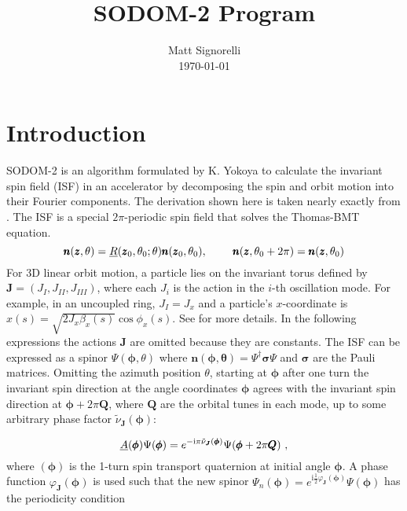 \documentclass{hitec}     %
\title{SODOM-2 Program}
\author{}
\date{Matt Signorelli\\ \today}
\newcommand{\Section}[1]{\section{#1}\vspace*{-1ex}}
\begin{document}
{}
\maketitle
{}
{}
\tableofcontents


\Section{Introduction}
\label{s:intro}
SODOM-2 is an algorithm formulated by K. Yokoya \cite{b:yokoya} to calculate the invariant spin field (ISF) in an accelerator by decomposing the spin and orbit motion into their Fourier components. The derivation shown here is taken nearly exactly from \cite{b:spin.hoff}. The ISF is a special $2\pi$-periodic spin field that solves the Thomas-BMT equation.
\begin{equation}
    \pmb{n}(\pmb{z},\theta)=\textrm{\underbar{$R$}}(\pmb{z}_0,\theta_0 ; \theta)\pmb{n}(\pmb{z}_0, \theta_0),\ \ \ \ \ \ \ \pmb{n}(\pmb{z},\theta_0+2\pi) = \pmb{n}(\pmb{z},\theta_0)
\end{equation}
For 3D linear orbit motion, a particle lies on the invariant torus defined by $\pmb{J} = (J_I, J_{II}, J_{III})$, where each $J_i$ is the action in the $i$-th oscillation mode. For example, in an uncoupled ring, $J_I = J_x$ and a particle's $x$-coordinate is $x(s)=\sqrt{2J_x\beta_x(s)}\cos{\phi_{x}(s)}$. See \cite{b:wolski} for more details. In the following expressions the actions $\pmb{J}$ are omitted because they are constants. The ISF can be expressed as a spinor $\Psi(\pmb{\phi},\theta)$ where $\pmb{n}(\pmb{\phi,\theta}) = \Psi^\dagger\pmb{\sigma}\Psi$ and $\pmb{\sigma}$ are the Pauli matrices. Omitting the azimuth position $\theta$, starting at $\pmb{\phi}$ after one turn the invariant spin direction at the angle coordinates $\pmb{\phi}$ agrees with the invariant spin direction at $\pmb{\phi}+2\pi\pmb{Q}$, where $\pmb{Q}$ are the orbital tunes in each mode, up to some arbitrary phase factor $\tilde{\nu}_{\pmb{J}}(\pmb{\phi})$:

\begin{equation}
   \textrm{\underbar{$A$}}(\pmb{\phi})\Psi(\pmb{\phi}) =e^{-\textrm{i}\pi\tilde{\nu}_{\pmb{J}}(\pmb{\phi})}\Psi(\pmb{\phi}+2\pi\pmb{Q})  \ , 
\end{equation}
where \textrm{}$(\pmb{\phi})$ is the 1-turn spin transport quaternion at initial angle $\pmb{\phi}$. A phase function $\varphi_{\pmb{J}}(\pmb{\phi})$ is used such that the new spinor $\Psi_n(\pmb{\phi})=e^{\textrm{i}\frac{1}{2}\varphi_{\pmb{J}}(\pmb{\phi})}\Psi(\pmb{\phi})$ has the periodicity condition
\end{document}
